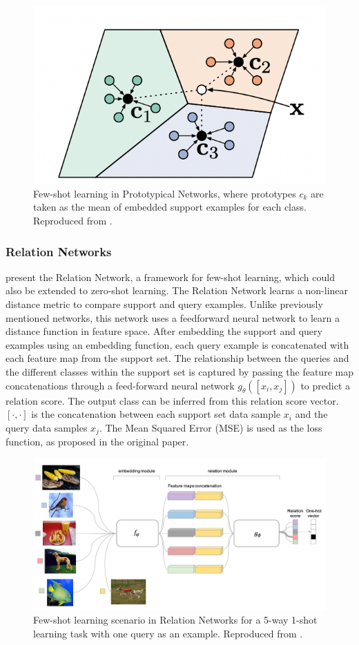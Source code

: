 \begin{figure}[!ht]
    \centering
    \includegraphics[width=0.7\linewidth]{img/protonets.png}
    \caption{Few-shot learning in Prototypical Networks, where prototypes \textbf{$c_k$} are taken as the mean of embedded support examples for each class. Reproduced from \citet{snell2017prototypical}.}
    \label{fig:protonets}
\end{figure}

\subsubsection{Relation Networks}

\citet{sung2018learning} present the Relation Network, a framework for few-shot learning, which could also be extended to zero-shot learning. The Relation Network learns a non-linear distance metric to compare support and query examples. Unlike previously mentioned networks, this network uses a feedforward neural network to learn a distance function in feature space. After embedding the support and query examples using an embedding function, each query example is concatenated with each feature map from the support set. The relationship between the queries and the different classes within the support set is captured by passing the feature map concatenations through a feed-forward neural network $g_\theta([x_i, x_j])$ to predict a relation score. The output class can be inferred from this relation score vector. $[\cdot,\cdot]$ is the concatenation between each support set data sample $x_i$ and the query data samples $x_j$. The Mean Squared Error (MSE) is used as the loss function, as proposed in the original paper. 

\begin{figure}[h]
    \centering
    \includegraphics[width=0.9\linewidth]{img/relation-nets.png}
    \caption[Relation Networks]{Few-shot learning scenario in Relation Networks for a 5-way 1-shot learning task with one query as an example. Reproduced from \citet{sung2018learning}.}
    \label{fig:relationnets}
\end{figure}

